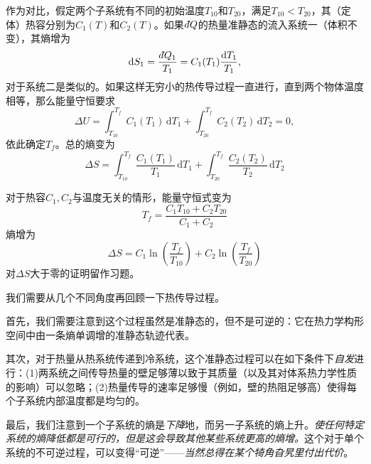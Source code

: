 作为对比，假定两个子系统有不同的初始温度$T_{10}$和$T_{20}$，满足$T_{10}<T_{20}$，其（定体）热容分别为$C_1(T)$和$C_2(T)$。如果$d\hspace*{-0.08em}\bar{}\hspace*{0.1em} Q$的热量准静态的流入系统一（体积不变），其熵增为
\begin{equation}
\mathrm dS_1 = \frac{d\hspace*{-0.08em}\bar{}\hspace*{0.1em} Q_1}{T_1} = C_1(T_1)\frac{\mathrm dT_1}{T_1},
\end{equation}
对于系统二是类似的。如果这样无穷小的热传导过程一直进行，直到两个物体温度相等，那么能量守恒要求
\begin{equation}
\Delta U = \int_{T_{10}}^{T_f} C_1(T_1)\,\mathrm dT_1 + \int_{T_{20}}^{T_f}C_2(T_2)\,\mathrm dT_2 = 0,
\end{equation}
依此确定$T_f$。总的熵变为
\begin{equation}
\Delta S = \int_{T_{10}}^{T_f} \frac{C_1(T_1)}{T_1}\,\mathrm dT_1 + \int_{T_{20}}^{T_f}\frac{C_2(T_2)}{T_2}\,\mathrm dT_2
\end{equation}

对于热容$C_1,C_2$与温度无关的情形，能量守恒式变为
\begin{equation}
T_f = \frac{C_1T_{10}+C_2T_{20}}{C_1+C_2}
\end{equation}
熵增为
\begin{equation}
\Delta S = C_1\ln\left(\frac{T_f}{T_{10}}\right) + C_2\ln\left(\frac{T_f}{T_{20}}\right)
\label{equ4.5}
\end{equation}
对$\Delta S$大于零的证明留作习题。

我们需要从几个不同角度再回顾一下热传导过程。

首先，我们需要注意到这个过程虽然是准静态的，但不是可逆的：它在热力学构形空间中由一条熵单调增的准静态轨迹代表。

其次，对于热量从热系统传递到冷系统，这个准静态过程可以在如下条件下{\it 自发}进行：(1)两系统之间传导热量的壁足够薄以致于其质量（以及其对体系热力学性质的影响）可以忽略；(2)热量传导的速率足够慢（例如，壁的热阻足够高）使得每个子系统内部温度都是均匀的。

最后，我们注意到一个子系统的熵是{\it 下降}地，而另一子系统的熵上升。{\it 使任何特定系统的熵降低都是可行的，但是这会导致其他某些系统更高的熵增。}这个对于单个系统的不可逆过程，可以变得“可逆”——{\it 当然总得在某个犄角旮旯里付出代价}。

